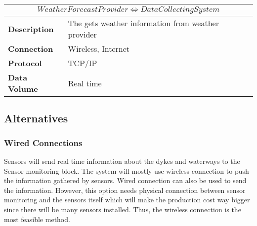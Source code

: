 \begin{table}[!htbp]
	\centering
    \begin{tabular}{L{} L{}}
    \toprule
     \\ \midrule
    \textbf{Description} & The \ProjectName{} gets weather information from weather provider \\
    \textbf{Connection} & Wireless, Internet \\
    \textbf{Protocol} & TCP/IP \\
    \textbf{Data Volume} & Real time \\
    \bottomrule
    \end{tabular}
\end{table}

\subsection{Alternatives}

\subsubsection*{Wired Connections}
Sensors will send real time information about the dykes and waterways to the Sensor monitoring block. The system will mostly use wireless connection to push the information gathered by sensors. Wired connection can also be used to send the information. However, this option needs physical connection between sensor monitoring and the sensors itself which will make the production cost way bigger since there will be many sensors installed. Thus, the wireless connection is the most feasible method.
